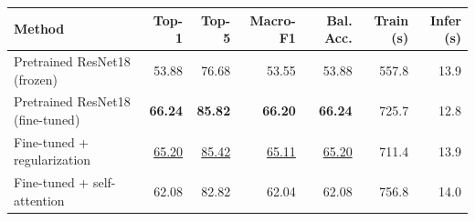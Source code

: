 \begin{tabular}{lrrrrrr}
\toprule
Method & Top-1 & Top-5 & Macro-F1 & Bal. Acc. & Train (s) & Infer (s) \\
\midrule
Pretrained ResNet18 (frozen) & 53.88 & 76.68 & 53.55 & 53.88 & 557.8 & 13.9 \\
Pretrained ResNet18 (fine-tuned) & \textbf{66.24} & \textbf{85.82} & \textbf{66.20} & \textbf{66.24} & 725.7 & 12.8 \\
Fine-tuned + regularization & \underline{65.20} & \underline{85.42} & \underline{65.11} & \underline{65.20} & 711.4 & 13.9 \\
Fine-tuned + self-attention & 62.08 & 82.82 & 62.04 & 62.08 & 756.8 & 14.0 \\
\bottomrule
\end{tabular}
